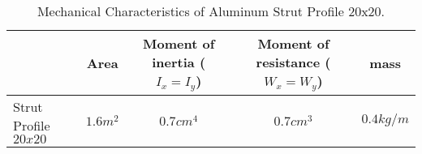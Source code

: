 \begin{table}[]
\centering
\begin{tabular}{l|c|c|c|c|}
\cline{2-5}
 & Area & Moment of inertia ($I_x = I_y$) & Moment of resistance ($W_x=W_y$) & mass \\ \hline
\multicolumn{1}{|l|}{Strut Profile $20x20$} & $1.6m^2$ & $0.7cm^4$ & $0.7cm^3$ & $0.4kg/m$ \\ \hline
\end{tabular}
\caption{Mechanical Characteristics of Aluminum Strut Profile 20x20.}
\label{strut-profile}
\end{table}